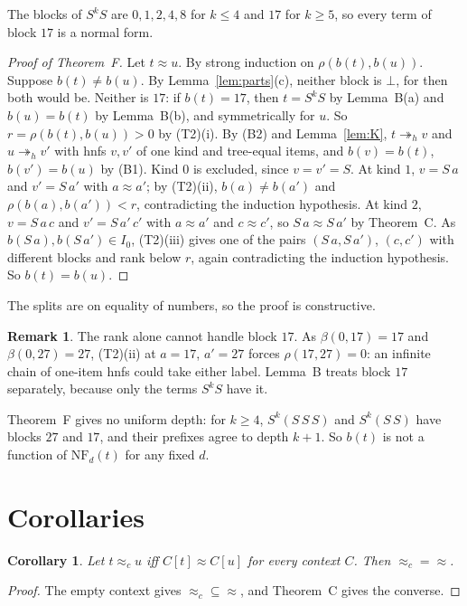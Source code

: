 \documentclass[11pt]{amsart}
\newtheorem{corollary}[theorem]{Corollary}
\theoremstyle{definition}
\newtheorem{remark}[theorem]{Remark}
\newcommand{\hred}{\twoheadrightarrow_h}
\newcommand{\NF}{\mathrm{NF}}
\newcommand{\eqc}{\approx_c}
\begin{document}
The blocks of $S^kS$ are $0,1,2,4,8$ for $k\le4$ and $17$ for $k\ge5$, so every term of block $17$ is a
normal form.

\begin{proof}[Proof of Theorem~F]
Let $t\approx u$. By strong induction on $\rho(b(t),b(u))$. Suppose $b(t)\ne b(u)$. By Lemma~\ref{lem:parts}(c), neither
block is $\bot$, for then both would be. Neither is $17$: if $b(t)=17$, then $t=S^kS$ by Lemma~B(a)
and $b(u)=b(t)$ by Lemma~B(b), and symmetrically for $u$. So $r=\rho(b(t),b(u))>0$ by (T2)(i). By (B2)
and Lemma~\ref{lem:K}, $t\hred v$ and $u\hred v'$ with hnfs $v,v'$ of one kind and tree-equal items, and
$b(v)=b(t)$, $b(v')=b(u)$ by (B1). Kind $0$ is excluded, since $v=v'=S$. At kind $1$, $v=S\,a$ and
$v'=S\,a'$ with $a\approx a'$; by (T2)(ii), $b(a)\ne b(a')$ and $\rho(b(a),b(a'))<r$, contradicting the
induction hypothesis. At kind $2$, $v=S\,a\,c$ and $v'=S\,a'\,c'$ with $a\approx a'$ and $c\approx c'$, so
$S\,a\approx S\,a'$ by Theorem~C. As $b(S\,a),b(S\,a')\in I_0$, (T2)(iii) gives one of the pairs
$(S\,a,S\,a')$, $(c,c')$ with different blocks and rank below $r$, again contradicting the
induction hypothesis. So $b(t)=b(u)$.
\end{proof}

The splits are on equality of numbers, so the proof is constructive.

\begin{remark}
The rank alone cannot handle block $17$. As $\beta(0,17)=17$ and $\beta(0,27)=27$, (T2)(ii) at
$a=17$, $a'=27$ forces $\rho(17,27)=0$: an infinite chain of one-item hnfs could take either label.
Lemma~B treats block $17$ separately, because only the terms $S^kS$ have it.

Theorem~F gives no uniform depth: for $k\ge4$, $S^k(S\,S\,S)$ and $S^k(S\,S)$ have blocks
$27$ and $17$, and their prefixes agree to depth $k+1$. So $b(t)$ is not a function of $\NF_d(t)$ for
any fixed $d$.
\end{remark}

\section{Corollaries}\label{sec:cor}

\begin{corollary}\label{cor:c}
Let $t\eqc u$ iff $C[t]\approx C[u]$ for every context $C$. Then ${\eqc}={\approx}$.
\end{corollary}

\begin{proof}
The empty context gives ${\eqc}\subseteq{\approx}$, and Theorem~C gives the converse.
\end{proof}
\end{document}
